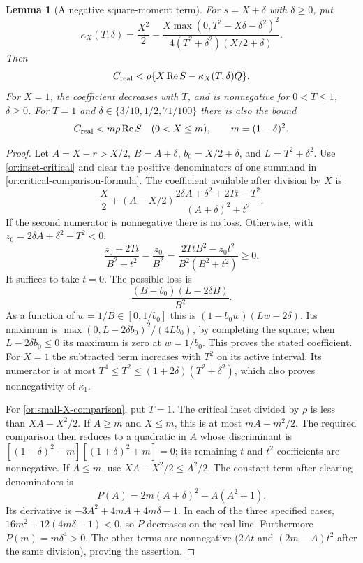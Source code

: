 \documentclass[11pt,reqno]{amsart}
\numberwithin{equation}{section}
\newtheorem{lemma}[theorem]{Lemma}
\theoremstyle{definition}
\theoremstyle{remark}
\renewcommand{\Re}{\operatorname{Re}}
\begin{document}
\begin{lemma}[A negative square-moment term]\label{or:critical-comparison}
For $s=X+\delta$ with $\delta\ge0$, put
\begin{equation}\label{or:kappa}
 \kappa_X(T,\delta)=\frac{X^2}{2}
 -\frac{X\max(0,T^2-X\delta-\delta^2)^2}
             {4(T^2+\delta^2)(X/2+\delta)}.
\end{equation}
Then
\begin{equation}\label{or:critical-comparison-formula}
 C_{\rm real}<\rho\{X\Re S-\kappa_X(T,\delta)Q\}.
\end{equation}
For $X=1$, the coefficient decreases with $T$, and is nonnegative for
$0<T\le1$, $\delta\ge0$.  For $T=1$ and
$\delta\in\{3/10,1/2,71/100\}$ there is also the bound
\begin{equation}\label{or:small-X-comparison}
 C_{\rm real}<m\rho\Re S\quad(0<X\le m),\qquad
                         m=(1-\delta)^2.
\end{equation}
\end{lemma}
\begin{proof}
Let $A=X-r>X/2$, $B=A+\delta$, $b_0=X/2+\delta$, and
$L=T^2+\delta^2$.  Use \eqref{or:inset-critical} and clear the
positive denominators of one summand in
\eqref{or:critical-comparison-formula}.  The coefficient available
after division by $X$ is
\[
 \frac X2+(A-X/2)
       \frac{2\delta A+\delta^2+2Tt-T^2}{(A+\delta)^2+t^2}.
\]
If the second numerator is nonnegative there is no loss.  Otherwise,
with $z_0=2\delta A+\delta^2-T^2<0$,
\[
 \frac{z_0+2Tt}{B^2+t^2}-\frac{z_0}{B^2}
       =\frac{2TtB^2-z_0t^2}{B^2(B^2+t^2)}\ge0.
\]
It suffices to take $t=0$.  The possible loss is
\[
 \frac{(B-b_0)(L-2\delta B)}{B^2}.
\]
As a function of $w=1/B\in[0,1/b_0]$ this is
$(1-b_0w)(Lw-2\delta)$.  Its maximum is
$\max(0,L-2\delta b_0)^2/(4Lb_0)$, by completing the square; when
$L-2\delta b_0\le0$ its maximum is zero at $w=1/b_0$.
This proves the stated coefficient.  For $X=1$ the subtracted term
increases with $T^2$ on its active interval.  Its numerator is at
most $T^4\le T^2\le(1+2\delta)(T^2+\delta^2)$, which also proves
nonnegativity of $\kappa_1$.

For \eqref{or:small-X-comparison}, put $T=1$.  The critical inset
divided by $\rho$ is less than $XA-X^2/2$.  If $A\ge m$ and $X\le m$,
this is at most $mA-m^2/2$.  The required comparison then reduces to
a quadratic in $A$ whose discriminant is
$[(1-\delta)^2-m][(1+\delta)^2+m]=0$; its remaining $t$ and $t^2$
coefficients are nonnegative.  If $A\le m$, use
$XA-X^2/2\le A^2/2$.  The constant term after clearing denominators is
\[
 P(A)=2m(A+\delta)^2-A(A^2+1).
\]
Its derivative is $-3A^2+4mA+4m\delta-1$.  In each of the three
specified cases,
$16m^2+12(4m\delta-1)<0$, so $P$ decreases on the real line.
Furthermore $P(m)=m\delta^4>0$.  The other terms are nonnegative
($2At$ and $(2m-A)t^2$ after the same division), proving the assertion.
\end{proof}
\end{document}
